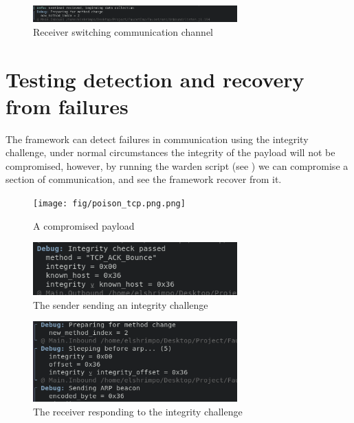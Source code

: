 \begin{figure}[h]
    \centering
    \includegraphics[width=0.7\textwidth]{fig/receiver_adapt.png}
    \caption{Receiver switching communication channel}
    \label{fig:recv_switch}
\end{figure}

\section{Testing detection and recovery from failures}

The framework can detect failures in communication using the integrity challenge, under normal circumstances the integrity of the payload will not be compromised, however, by running the warden script (see ) we can compromise a section of communication, and see the framework recover from it.

\begin{figure}[h]
    \centering
    \texttt{[image: fig/poison\_tcp.png.png]}
    \caption{A compromised payload}
    \label{fig:poison_tcp}
\end{figure}

\begin{figure}
    \centering
    \includegraphics[width=0.7\textwidth]{fig/integrity_challenge.png}
    \caption{The sender sending an integrity challenge}
    \label{fig:integrity_challenge}
\end{figure}

\begin{figure}
    \centering
    \includegraphics[width=0.7\textwidth]{fig/integrity_response.png}
    \caption{The receiver responding to the integrity challenge}
    \label{fig:integrity_response}
\end{figure}

